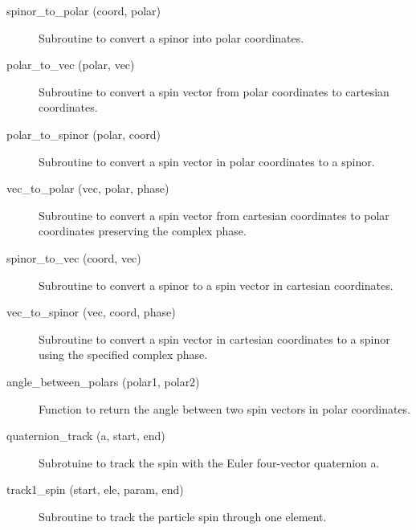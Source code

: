 \begin{description}

\label{r:spinor.to.polar}
\item[spinor_to_polar (coord, polar)] \Newline 
Subroutine to convert a spinor into polar coordinates.

\label{r:polar.to.vec}
\item[polar_to_vec (polar, vec)] \Newline
Subroutine to convert a spin vector from polar coordinates to cartesian coordinates.

\label{r:polar.to.spinor}
\item[polar_to_spinor (polar, coord)] \Newline
Subroutine to convert a spin vector in polar coordinates to a spinor.

\label{r:vec.to.polar}
\item[vec_to_polar (vec, polar, phase)] \Newline
Subroutine to convert a spin vector from cartesian coordinates to polar coordinates 
preserving the complex phase.

\label{r:spinor.to.vec}
\item[spinor_to_vec (coord, vec)] \Newline
Subroutine to convert a spinor to a spin vector in cartesian coordinates.

\label{r:vec.to.spinor}
\item[vec_to_spinor (vec, coord, phase)] \Newline
Subroutine to convert a spin vector in cartesian coordinates to a spinor using
the specified complex phase.

\label{r:angle.between.polars}
\item[angle_between_polars (polar1, polar2)] \Newline
Function to return the angle between two spin vectors in polar coordinates.

\label{r:quaternion.track}
\item[quaternion_track (a, start, end)] \Newline
Subrotuine to track the spin with the Euler four-vector quaternion a.

\label{r:track1.spin}
\item[track1_spin (start, ele, param, end)] \Newline
Subroutine to track the particle spin through one element.

\end{description}


